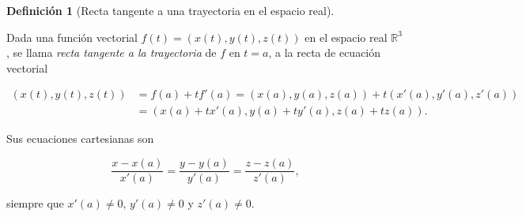 \documentclass[
  a4paper,
]{scrreport}
\theoremstyle{definition}
\theoremstyle{plain}
\theoremstyle{plain}
\theoremstyle{plain}
\theoremstyle{definition}
\newtheorem{definition}{Definición}[chapter]
\theoremstyle{remark}
\begin{document}
\begin{definition}[Recta tangente a una trayectoria en el espacio
real]\protect\hypertarget{def-tangente-trayectoria-espacio}{}\label{def-tangente-trayectoria-espacio}

Dada una función vectorial \(f(t)=(x(t),y(t),z(t))\) en el espacio real
\(\mathbb{R}^3\), se llama \emph{recta tangente a la trayectoria} de
\(f\) en \(t=a\), a la recta de ecuación vectorial

\begin{align*}
(x(t), y(t), z(t)) 
&= f(a)+tf'(a) = (x(a), y(a), z(a)) + t(x'(a), y'(a), z'(a)) \\
& = (x(a)+tx'(a), y(a)+ty'(a), z(a)+tz(a)).
\end{align*}

\end{definition}

Sus ecuaciones cartesianas son

\[
\frac{x-x(a)}{x'(a)}=\frac{y-y(a)}{y'(a)}=\frac{z-z(a)}{z'(a)},
\]

siempre que \(x'(a)\neq 0\), \(y'(a)\neq 0\) y \(z'(a)\neq 0\).
\end{document}
